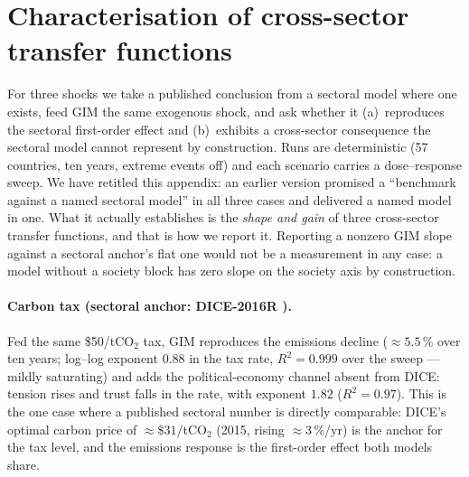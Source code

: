 \documentclass[12pt,a4paper]{article}
\renewcommand{\thefigure}{\arabic{figure}}
\begin{document}
\renewcommand{\theequation}{B\arabic{equation}}
\renewcommand{\thetable}{B\arabic{table}}
\renewcommand{\thefigure}{B\arabic{figure}}
\setcounter{equation}{0}\setcounter{table}{0}\setcounter{figure}{0}

\section{Characterisation of cross-sector transfer functions}
\label{app:benchmark}

For three shocks we take a published conclusion from a sectoral model where one exists, feed
GIM the same exogenous shock, and ask whether it (a)~reproduces the sectoral first-order effect
and (b)~exhibits a cross-sector consequence the sectoral model cannot represent by
construction. Runs are deterministic (57 countries, ten years, extreme events off) and each
scenario carries a dose--response sweep. We have retitled this appendix: an earlier version
promised a ``benchmark against a named sectoral model'' in all three cases and delivered a
named model in one. What it actually establishes is the \emph{shape and gain} of three
cross-sector transfer functions, and that is how we report it. Reporting a nonzero GIM slope
against a sectoral anchor's flat one would not be a measurement in any case: a model without a
society block has zero slope on the society axis by construction.

\paragraph{Carbon tax (sectoral anchor: DICE-2016R \citep{nordhaus2017,nordhaus2018}).} Fed the
same \$50/tCO$_2$ tax, GIM reproduces the emissions decline (${\approx}5.5\,\%$ over ten years;
log--log exponent $0.88$ in the tax rate, $R^2=0.999$ over the sweep --- mildly saturating) and
adds the political-economy channel absent from DICE: tension rises and trust falls in the rate,
with exponent $1.82$ ($R^2=0.97$). This is the one case where a published sectoral number is
directly comparable: DICE's optimal carbon price of ${\approx}\$31$/tCO$_2$ (2015, rising
${\approx}3\,\%$/yr) is the anchor for the tax level, and the emissions response is the
first-order effect both models share.
\end{document}
